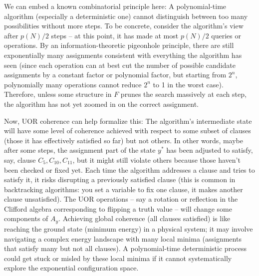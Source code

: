 \documentclass[11pt]{article}
\begin{document}
We can embed a known combinatorial principle here: A polynomial-time algorithm (especially a deterministic one) cannot distinguish between too many possibilities without more steps. To be concrete, consider the algorithm’s view after \(p(N)/2\) steps -- at this point, it has made at most \(p(N)/2\) queries or operations. By an information-theoretic pigeonhole principle, there are still exponentially many assignments consistent with everything the algorithm has seen (since each operation can at best cut the number of possible candidate assignments by a constant factor or polynomial factor, but starting from \(2^n\), polynomially many operations cannot reduce \(2^n\) to 1 in the worst case). Therefore, unless some structure in \(F\) prunes the search massively at each step, the algorithm has not yet zoomed in on the correct assignment.

Now, UOR coherence can help formalize this: The algorithm’s intermediate state will have some level of coherence achieved with respect to some subset of clauses (those it has effectively satisfied so far) but not others. In other words, maybe after some steps, the assignment part of the state \(y^*\) has been adjusted to satisfy, say, clause \(C_5, C_{10}, C_{11}\), but it might still violate others because those haven’t been checked or fixed yet. Each time the algorithm addresses a clause and tries to satisfy it, it risks disrupting a previously satisfied clause (this is common in backtracking algorithms: you set a variable to fix one clause, it makes another clause unsatisfied). The UOR operations -- say a rotation or reflection in the Clifford algebra corresponding to flipping a truth value -- will change some components of \(A_y\). Achieving global coherence (all clauses satisfied) is like reaching the ground state (minimum energy) in a physical system; it may involve navigating a complex energy landscape with many local minima (assignments that satisfy many but not all clauses). A polynomial-time deterministic process could get stuck or misled by these local minima if it cannot systematically explore the exponential configuration space.
\end{document}
